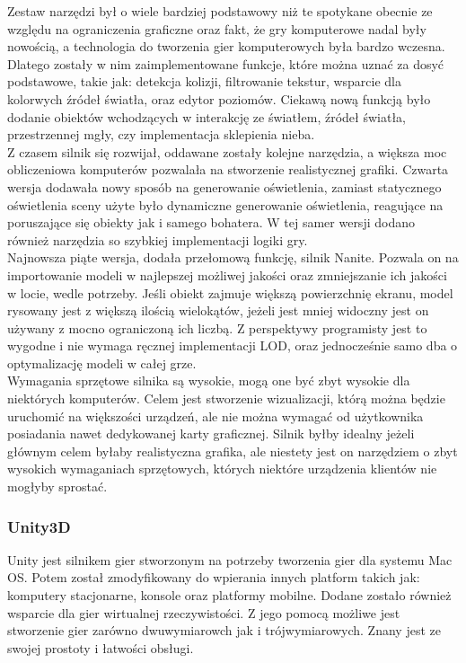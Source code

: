\documentclass{article} %
\begin{document}
        Zestaw narzędzi był o wiele bardziej podstawowy niż te spotykane obecnie ze względu na ograniczenia graficzne oraz fakt, że gry komputerowe nadal były nowością, a technologia do tworzenia gier komputerowych była bardzo wczesna. Dlatego zostały w nim zaimplementowane funkcje, które można uznać za dosyć podstawowe, takie jak: detekcja kolizji, filtrowanie tekstur, wsparcie dla kolorwych źródeł światła, oraz edytor poziomów. Ciekawą nową funkcją było dodanie obiektów wchodzących w interakcję ze światłem, źródeł światła, przestrzennej mgły, czy implementacja sklepienia nieba.
        \\
        
        Z czasem silnik się rozwijał, oddawane zostały kolejne narzędzia, a większa moc obliczeniowa komputerów pozwalała na stworzenie realistycznej grafiki. Czwarta wersja dodawała nowy sposób na generowanie oświetlenia, zamiast statycznego oświetlenia sceny użyte było dynamiczne generowanie oświetlenia, reagujące na poruszające się obiekty jak i samego bohatera. W tej samer wersji dodano również narzędzia so szybkiej implementacji logiki gry.
        \\
        
        Najnowsza piąte wersja, dodała przełomową funkcję, silnik Nanite. Pozwala on na importowanie modeli w najlepszej możliwej jakości oraz zmniejszanie ich jakości w locie, wedle potrzeby. Jeśli obiekt zajmuje większą powierzchnię ekranu, model rysowany jest z większą ilością wielokątów, jeżeli jest mniej widoczny jest on używany z mocno ograniczoną ich liczbą. Z perspektywy programisty jest to wygodne i nie wymaga ręcznej implementacji LOD, oraz jednocześnie samo dba o optymalizację modeli w całej grze.
        \\
        
        Wymagania sprzętowe silnika są wysokie, mogą one być zbyt wysokie dla niektórych komputerów. Celem jest stworzenie wizualizacji, którą można będzie uruchomić na większości urządzeń, ale nie można wymagać od użytkownika posiadania nawet dedykowanej karty graficznej. Silnik byłby idealny jeżeli głównym celem byłaby realistyczna grafika, ale niestety jest on narzędziem o zbyt wysokich wymaganiach sprzętowych, których niektóre urządzenia klientów nie mogłyby sprostać.
        \\
        
        \subsubsection*{Unity3D}
        Unity jest silnikem gier stworzonym na potrzeby tworzenia gier dla systemu Mac OS. Potem został zmodyfikowany do wpierania innych platform takich jak: komputery stacjonarne, konsole oraz platformy mobilne. Dodane zostało również wsparcie dla gier wirtualnej rzeczywistości. Z jego pomocą możliwe jest stworzenie gier zarówno dwuwymiarowch jak i trójwymiarowych. Znany jest ze swojej prostoty i łatwości obsługi.
        \\
        
\end{document}
